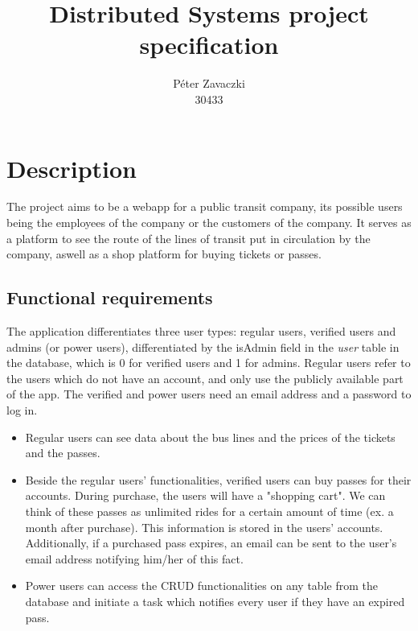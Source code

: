 \documentclass[a4paper,12pt]{report}
\title{Distributed Systems project specification}
\author{Péter Zavaczki\\30433}
\begin{document}
\maketitle

\chapter{Description}
The project aims to be a webapp for a public transit company, its possible users being the employees of the company or the customers of the company.
It serves as a platform to see the route of the lines of transit put in circulation by the company, aswell as a shop platform for buying tickets or passes.

\section{Functional requirements}
The application differentiates three user types: regular users, verified users and admins (or power users), differentiated by the isAdmin field in the \textit{user} table in the database, which is 0 for verified users and 1 for admins.
Regular users refer to the users which do not have an account, and only use the publicly available part of the app.
The verified and power users need an email address and a password to log in.

\begin{itemize}
    \item Regular users can see data about the bus lines and the prices of the tickets and the passes.
    \item Beside the regular users' functionalities, verified users can buy passes for their accounts.
    During purchase, the users will have a "shopping cart".
    We can think of these passes as unlimited rides for a certain amount of time (ex. a month after purchase).
    This information is stored in the users' accounts.
    Additionally, if a purchased pass expires, an email can be sent to the user's email address notifying him/her of this fact.
    \item Power users can access the CRUD functionalities on any table from the database and initiate a task which notifies every user if they have an expired pass.
\end{itemize}
\end{document}
